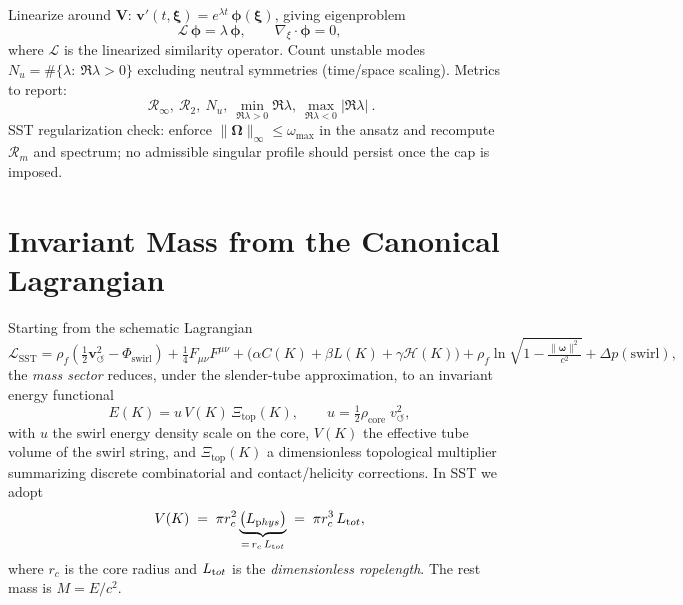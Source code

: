 \documentclass[10pt,reprint,aps,onecolumn,nofootinbib]{revtex4-2}
\newcommand{\vswirl}{\mathbf{v}_{\!\boldsymbol{\circlearrowleft}}}
\newcommand{\rhof}{\rho_{\!f}}                           %
\begin{document}
    Linearize around \(\mathbf{V}\): \(\mathbf{v}'(t,\boldsymbol{\xi})=e^{\lambda t}\,\boldsymbol{\phi}(\boldsymbol{\xi})\), giving eigenproblem
    \[
        \mathcal{L}\,\boldsymbol{\phi}=\lambda\,\boldsymbol{\phi},\qquad \nabla_{\!\xi}\!\cdot\!\boldsymbol{\phi}=0,
    \]
    where \(\mathcal{L}\) is the linearized similarity operator.
    Count unstable modes \(N_u = \#\{\lambda:\ \Re\lambda>0\}\) excluding neutral symmetries (time/space scaling).
    Metrics to report:
    \[
        \boxed{
            \ \mathcal{R}_\infty,\ \mathcal{R}_2,\ N_u,\ \min_{\Re\lambda>0}\Re\lambda,\ \max_{\Re\lambda<0}|\Re\lambda|
            \ } .
    \]
    SST regularization check: enforce \(\lVert \boldsymbol{\Omega}\rVert_\infty\le \omega_{\max}\) in the ansatz and recompute \(\mathcal{R}_m\) and spectrum; no admissible singular profile should persist once the cap is imposed.

    \section{Invariant Mass from the Canonical Lagrangian}

    Starting from the schematic Lagrangian
    \[
        \mathcal{L}_{\text{SST}}
        = \rhof\!\left(\tfrac{1}{2}\vswirl^2 - \Phi_{\text{swirl}}\right)
        + \tfrac{1}{4}F_{\mu\nu}F^{\mu\nu}
        + \big(\alpha C(K)+\beta L(K)+\gamma \mathcal{H}(K)\big)
        + \rhof \ln\!\sqrt{1-\tfrac{\|\boldsymbol\omega\|^2}{c^2}}
        + \Delta p(\text{swirl}),
    \]
    the \emph{mass sector} reduces, under the slender-tube approximation, to an invariant energy functional
    \[
        E(K)= u\,V(K)\,\Xi_{\text{top}}(K),\qquad
        u=\tfrac{1}{2}\rho_{\text{core}}\;v_{\circlearrowleft}^{2},
    \]
    with $u$ the swirl energy density scale on the core, $V(K)$ the effective tube volume of the swirl string, and $\Xi_{\text{top}}(K)$ a dimensionless topological multiplier summarizing discrete combinatorial and contact/helicity corrections. In SST we adopt
    \[
        V(K)\;=\;\pi r_c^2 \underbrace{\big(L_{\textrm phys}\big)}_{=\,r_c\,L_{\textrm tot}}
        \;=\;\pi r_c^3\,L_{\textrm tot},
    \]
    where $r_c$ is the core radius and $L_{\textrm tot}$ is the \emph{dimensionless ropelength}. The rest mass is $M=E/c^2$.
\end{document}
